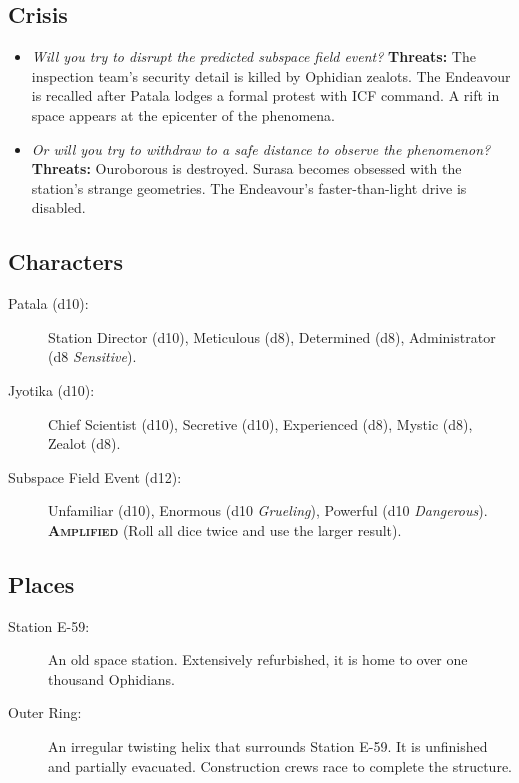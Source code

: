 \documentclass[11pt, a5paper, parskip=half-, DIV=12]{scrartcl}
\begin{document}
\subsection*{Crisis}

\begin{itemize}
	\item \textit{Will you try to disrupt the predicted subspace field event?} \textbf{Threats:} The inspection team's security detail is killed by Ophidian zealots. The Endeavour is recalled after Patala lodges a formal protest with ICF command. A rift in space appears at the epicenter of the phenomena.
	\item \textit{Or will you try to withdraw to a safe distance to observe the phenomenon?} \textbf{Threats:} Ouroborous is destroyed. Surasa becomes obsessed with the station's strange geometries. The Endeavour's faster-than-light drive is disabled. 
\end{itemize}

\newpage

\subsection*{Characters}
\begin{description}
	\item[Patala (d10):] Station Director (d10), Meticulous (d8), Determined (d8), Administrator (d8 \textit{Sensitive}).
	\item[Jyotika (d10):] Chief Scientist (d10), Secretive (d10), Experienced (d8), Mystic (d8), Zealot (d8).
	\item[Subspace Field Event (d12):] Unfamiliar (d10), Enormous (d10 \textit{Grueling}), Powerful (d10 \textit{Dangerous}). \textbf{\textsc{Amplified}} (Roll all dice twice and use the larger result).
\end{description}

\subsection*{Places}
\begin{description}
	\item[Station E-59:] An old space station.
	Extensively refurbished,
	it is home to over one thousand Ophidians.
	\item[Outer Ring:] An irregular twisting helix that surrounds Station E-59. It is unfinished and partially evacuated.
	Construction crews race to complete the structure.
\end{description}
\end{document}
